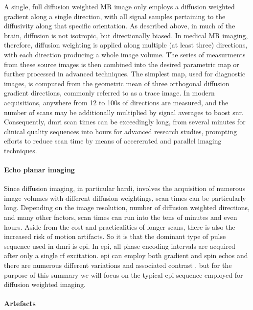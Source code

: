 A single, full diffusion weighted MR image only employs a diffusion weighted gradient along a single direction, with all signal samples pertaining to the diffusivity along that specific orientation.
As described above, in much of the brain, diffusion is not isotropic, but directionally biased.
In medical MR imaging, therefore, diffusion weighting is applied along multiple (at least three) directions, with each direction producing a whole image volume.
The series of measurments from these source images is then combined into the desired parametric map or further processed in advanced techniques.
The simplest map, used for diagnostic images, is computed from the geometric mean of three orthogonal diffusion gradient directions, commonly referred to as a trace image.
In modern acquisitions, anywhere from 12 to 100s of directions are measured, and the number of scans may be additionally multiplied by signal averages  to boost \gls{snr}.
Consequently, \Gls{dmri} scan times can be exceedingly long, from several minutes for clinical quality sequences into hours for advanced research studies, prompting efforts to reduce scan time by means of accererated and parallel imaging techniques.

\paragraph{Echo planar imaging}

Since diffusion imaging, in particular \gls{hardi}, involves the acquisition of numerous image volumes with different diffusion weightings, scan times can be particularly long.
Depending on the image resolution, number of diffusion weighted directions, and many other factors, scan times can run into the tens of minutes and even hours.
Aside from the cost and practicalities of longer scans, there is also the increased risk of motion artifacts.
So it is that the dominant  type of pulse sequence used in \gls{dmri} is \gls{epi}.
In \gls{epi}, all phase encoding intervals are acquired after only a single \gls{rf} excitation.
\Gls{epi} can employ both gradient and spin echos and there are numerous different variations and associated contrast , but for the purpose of this summary we will focus on the typical \gls{epi} sequence employed for diffusion weighted imaging.

\paragraph{Artefacts}

